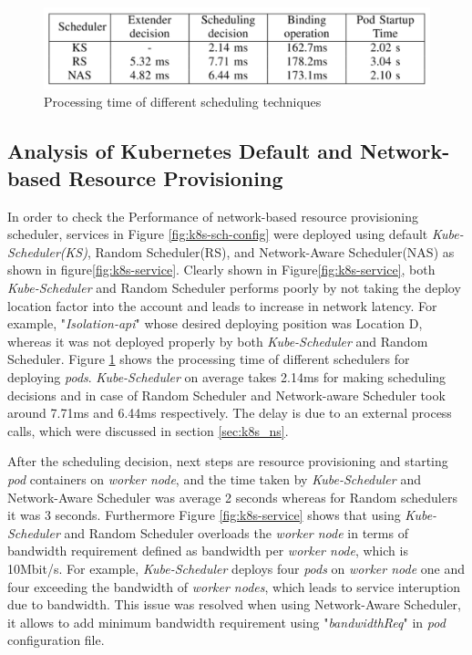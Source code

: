 \begin{figure}
  \centering
  \includegraphics[width=\linewidth]{figures/mlcn-k8s-exec-time.pdf}
  \caption{Processing time of different scheduling techniques\cite{Santos2019}}
  \label{fig:k8s-exec-t}
\end{figure}
\vspace{-0.5cm}
\subsection{Analysis of Kubernetes Default and Network-based Resource Provisioning}
\label{sec:analysis}
In order to check the Performance of network-based resource provisioning scheduler, services in Figure \ref{fig:k8s-sch-config} were deployed using default \emph{Kube-Scheduler(KS)}, Random Scheduler(RS), and Network-Aware Scheduler(NAS) as shown in figure\ref{fig:k8s-service}\cite{Santos2019}. Clearly shown in Figure\ref{fig:k8s-service}, both \emph{Kube-Scheduler} and Random Scheduler performs poorly by not taking the deploy location factor into the account and leads to increase in network latency\cite{Santos2019}. For example, "\emph{Isolation-api}" whose desired deploying position was Location D, whereas it was not deployed properly by both \emph{Kube-Scheduler} and Random Scheduler\cite{Santos2019}. Figure \ref{fig:k8s-exec-t} shows the processing time of different schedulers for deploying \emph{pods}. \emph{Kube-Scheduler} on average takes 2.14ms for making scheduling decisions and in case of Random Scheduler and Network-aware Scheduler took around 7.71ms and 6.44ms respectively\cite{Santos2019}. The delay is due to an external process calls, which were discussed in section \ref{sec:k8s_ns}.\par 
After the scheduling decision, next steps are resource provisioning and starting \emph{pod} containers on \emph{worker node}, and the time taken by \emph{Kube-Scheduler} and Network-Aware Scheduler was average 2 seconds whereas for Random schedulers it was 3 seconds\cite{Santos2019}. Furthermore Figure \ref{fig:k8s-service} shows that using \emph{Kube-Scheduler} and Random Scheduler overloads the \emph{worker node} in terms of bandwidth requirement defined as bandwidth per \emph{worker node}, which is 10Mbit/s\cite{Santos2019}. For example, \emph{Kube-Scheduler} deploys four \emph{pods} on \emph{worker node} one and four exceeding the bandwidth of \emph{worker nodes}, which leads to service interuption due to bandwidth\cite{Santos2019}. This issue was resolved when using Network-Aware Scheduler, it allows to add minimum bandwidth requirement using "\emph{bandwidthReq}" in \emph{pod} configuration file\cite{Santos2019}. \par
